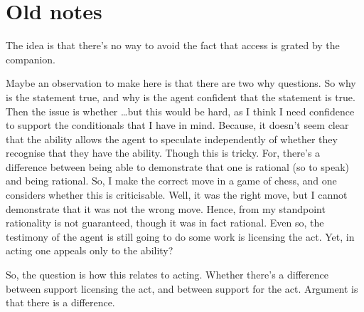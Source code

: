 \documentclass[10pt]{article}
\begin{document}
\newpage

\printbibliography


\newpage

\section*{Old notes}
\label{sec:old-notes}

{
  \color{red}
  The idea is that there's no way to avoid the fact that access is grated by the companion.

  Maybe an observation to make here is that there are two why questions.
  So why is the statement true, and why is the agent confident that the statement is true.
  Then the issue is whether \dots but this would be hard, as I think I need confidence to support the conditionals that I have in mind.
  Because, it doesn't seem clear that the ability allows the agent to speculate independently of whether they recognise that they have the ability.
  Though this is tricky.
  For, there's a difference between being able to demonstrate that one is rational (so to speak) and being rational.
  So, I make the correct move in a game of chess, and one considers whether this is criticisable.
  Well, it was the right move, but I cannot demonstrate that it was not the wrong move.
  Hence, from my standpoint rationality is not guaranteed, though it was in fact rational.
  Even so, the testimony of the agent is still going to do some work is licensing the act.
  Yet, in acting one appeals only to the ability?

  So, the question is how this relates to acting.
  Whether there's a difference between support licensing the act, and between support for the act.
  Argument is that there is a difference.
}
\end{document}
